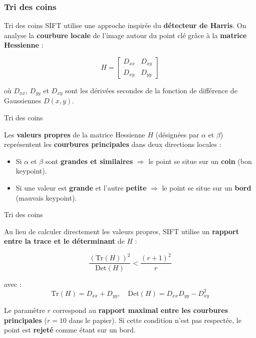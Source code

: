 \documentclass{beamer}
\begin{document}
\subsubsection{Tri des coins}
\begin{frame}{Tri des coins}
SIFT utilise une approche inspirée du \textbf{détecteur de Harris}.
On analyse la \textbf{courbure locale} de l’image autour du point clé 
grâce à la \textbf{matrice Hessienne} :

\[
H = 
\begin{bmatrix}
D_{xx} & D_{xy} \\
D_{xy} & D_{yy}
\end{bmatrix}
\]

où $D_{xx}$, $D_{yy}$ et $D_{xy}$ sont les dérivées secondes 
de la fonction de différence de Gaussiennes $D(x, y)$.

\end{frame}

\begin{frame}{Tri des coins}

Les \textbf{valeurs propres} de la matrice Hessienne $H$
(désignées par $\alpha$ et $\beta$)
représentent les \textbf{courbures principales} 
dans deux directions locales :

\begin{itemize}
    \item Si $\alpha$ et $\beta$ sont \textbf{grandes et similaires} 
    $\Rightarrow$ le point se situe sur un \textbf{coin} (bon keypoint).
    \item Si une valeur est \textbf{grande} et l’autre \textbf{petite} 
    $\Rightarrow$ le point se situe sur un \textbf{bord} (mauvais keypoint).
\end{itemize}

\vspace{0.4cm}

\end{frame}

\begin{frame}{Tri des coins}

Au lieu de calculer directement les valeurs propres,
SIFT utilise un \textbf{rapport entre la trace et le déterminant} de $H$ :

\[
\frac{(\mathrm{Tr}(H))^2}{\mathrm{Det}(H)} < \frac{(r + 1)^2}{r}
\]

avec :
\[
\mathrm{Tr}(H) = D_{xx} + D_{yy}, \quad
\mathrm{Det}(H) = D_{xx}D_{yy} - D_{xy}^2
\]

\vspace{0.4cm}

Le paramètre $r$ correspond au \textbf{rapport maximal entre les courbures principales} 
($r = 10$ dans le papier).  
Si cette condition n’est pas respectée, 
le point est \textbf{rejeté} comme étant sur un bord.

\end{frame}
\end{document}
